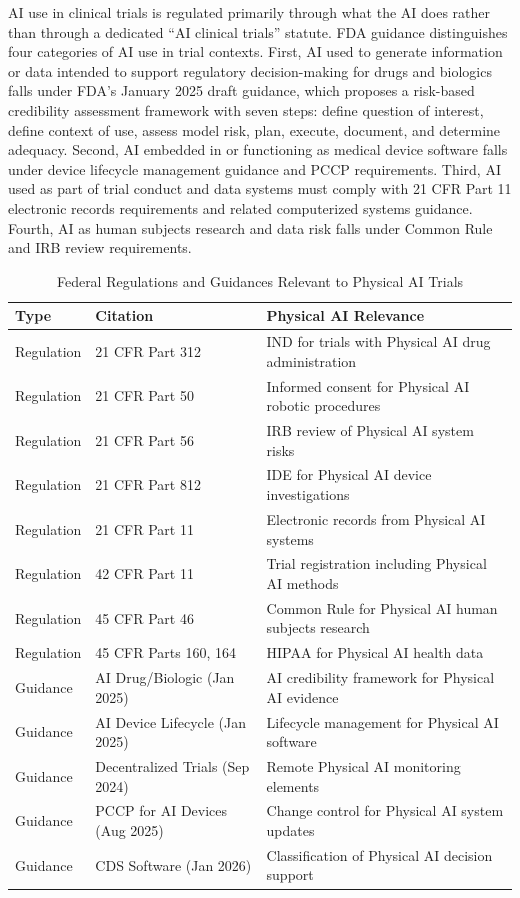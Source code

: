 AI use in clinical trials is regulated primarily through what the AI does rather
than through a dedicated ``AI clinical trials'' statute. FDA guidance
distinguishes four categories of AI use in trial contexts. First, AI used to
generate information or data intended to support regulatory decision-making for
drugs and biologics falls under FDA's January 2025 draft guidance, which
proposes a risk-based credibility assessment framework with seven steps: define
question of interest, define context of use, assess model risk, plan, execute,
document, and determine adequacy. Second, AI embedded in or functioning as
medical device software falls under device lifecycle management guidance and
PCCP requirements. Third, AI used as part of trial conduct and data systems
must comply with 21 CFR Part 11 electronic records requirements and related
computerized systems guidance. Fourth, AI as human subjects research and data
risk falls under Common Rule and IRB review requirements.

\begin{table}[H]
\centering
\caption{Federal Regulations and Guidances Relevant to Physical AI Trials}
\label{tab:regulations-ai}
\small
\begin{tabularx}{\textwidth}{l l X}
\toprule
\textbf{Type} & \textbf{Citation} & \textbf{Physical AI Relevance} \\
\midrule
Regulation & 21 CFR Part 312 & IND for trials with Physical AI drug administration \\
Regulation & 21 CFR Part 50 & Informed consent for Physical AI robotic procedures \\
Regulation & 21 CFR Part 56 & IRB review of Physical AI system risks \\
Regulation & 21 CFR Part 812 & IDE for Physical AI device investigations \\
Regulation & 21 CFR Part 11 & Electronic records from Physical AI systems \\
Regulation & 42 CFR Part 11 & Trial registration including Physical AI methods \\
Regulation & 45 CFR Part 46 & Common Rule for Physical AI human subjects research \\
Regulation & 45 CFR Parts 160, 164 & HIPAA for Physical AI health data \\
Guidance & AI Drug/Biologic (Jan 2025) & AI credibility framework for Physical AI evidence \\
Guidance & AI Device Lifecycle (Jan 2025) & Lifecycle management for Physical AI software \\
Guidance & Decentralized Trials (Sep 2024) & Remote Physical AI monitoring elements \\
Guidance & PCCP for AI Devices (Aug 2025) & Change control for Physical AI system updates \\
Guidance & CDS Software (Jan 2026) & Classification of Physical AI decision support \\
\bottomrule
\end{tabularx}
\end{table}

